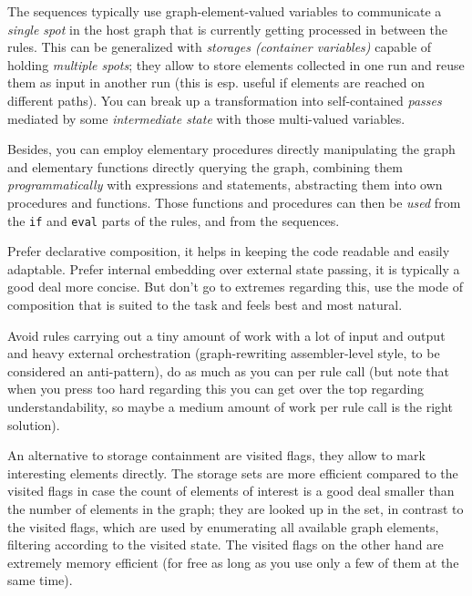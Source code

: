 The sequences typically use graph-element-valued variables to communicate a \emph{single spot} in the host graph that is currently getting processed in between the rules.
This can be generalized with \emph{storages (container variables)} capable of holding \emph{multiple spots}; they allow to store elements collected in one run and reuse them as input in another run (this is esp. useful if elements are reached on different paths).
You can break up a transformation into self-contained \emph{passes} mediated by some \emph{intermediate state} with those multi-valued variables. 

Besides, you can employ elementary procedures directly manipulating the graph and elementary functions directly querying the graph, combining them \emph{programmatically} with expressions and statements, abstracting them into own procedures and functions.
Those functions and procedures can then be \emph{used} from the \texttt{if} and \texttt{eval} parts of the rules, and from the sequences.

\begin{note}
Prefer declarative composition, it helps in keeping the code readable and easily adaptable.
Prefer internal embedding over external state passing, it is typically a good deal more concise.
But don't go to extremes regarding this, use the mode of composition that is suited to the task and feels best and most natural.

Avoid rules carrying out a tiny amount of work with a lot of input and output and heavy external orchestration (graph-rewriting assembler-level style, to be considered an anti-pattern), do as much as you can per rule call (but note that when you press too hard regarding this you can get over the top regarding understandability, so maybe a medium amount of work per rule call is the right solution).
\end{note}

\begin{note}
An alternative to storage containment are visited flags, they allow to mark interesting elements directly.
The storage sets are more efficient compared to the visited flags in case the count of elements of interest is a good deal smaller than the number of elements in the graph; they are looked up in the set, in contrast to the visited flags, which are used by enumerating all available graph elements, filtering according to the visited state.
The visited flags on the other hand are extremely memory efficient (for free as long as you use only a few of them at the same time).
\end{note}

